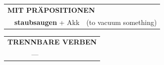 \documentclass[10pt,a4paper]{revtex4-2}
\begin{document}
\begin{verbbox}
\vspace{10pt}

\begin{tabular}{lll}
\multicolumn{3}{l}{\textbf{MIT PRÄPOSITIONEN}}\\
& \textbf{staubsaugen} + Akk & (to vacuum something)\\
\end{tabular}
\hfill
\begin{tabular}{lll}
\multicolumn{3}{l}{\textbf{TRENNBARE VERBEN}}\\
& ---\\
\end{tabular}

\vspace{-5pt}
\end{verbbox}

\end{document}
